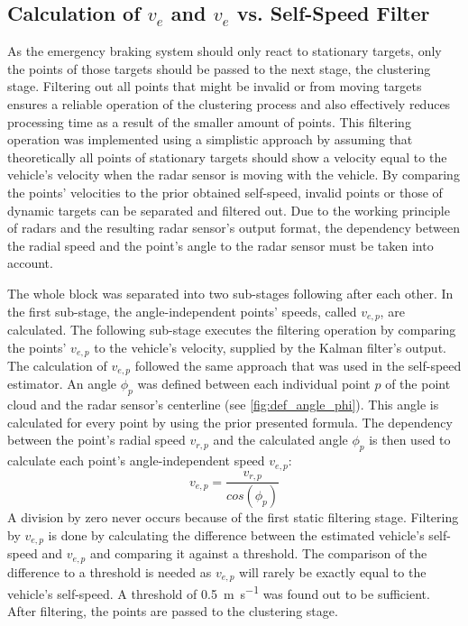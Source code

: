 \subsection{Calculation of $v_{e}$ and $v_{e}$ vs. Self-Speed Filter}

As the emergency braking system should only react to stationary targets, only the points of those targets should be passed to the next stage, the clustering stage.
Filtering out all points that might be invalid or from moving targets ensures a reliable operation of the clustering process and also effectively reduces processing time as a result of the smaller amount of points.
This filtering operation was implemented using a simplistic approach by assuming that theoretically all points of stationary targets should show a velocity equal to the vehicle's velocity when the radar sensor is moving with the vehicle.
By comparing the points' velocities to the prior obtained self-speed, invalid points or those of dynamic targets can be separated and filtered out.
Due to the working principle of radars and the resulting radar sensor's output format, the dependency between the radial speed and the point's angle to the radar sensor must be taken into account.
\par
The whole block was separated into two sub-stages following after each other.
In the first sub-stage, the angle-independent points' speeds, called $v_{e,p}$, are calculated. 
The following sub-stage executes the filtering operation by comparing the points' $v_{e,p}$ to the vehicle's velocity, supplied by the Kalman filter's output.
The calculation of $v_{e,p}$ followed the same approach that was used in the self-speed estimator.
An angle $\phi_{p}$ was defined between each individual point $p$ of the point cloud and the radar sensor's centerline (see \ref{fig:def_angle_phi}).
This angle is calculated for every point by using the prior presented formula.
The dependency between the point's radial speed $v_{r,p}$ and the calculated angle $\phi_{p}$ is then used to calculate each point's angle-independent speed $v_{e,p}$:
\begin{equation*}
    v_{e,p} = \frac{v_{r,p}}{cos(\phi_{p})}
\end{equation*}
A division by zero never occurs because of the first static filtering stage.
Filtering by $v_{e,p}$ is done by calculating the difference between the estimated vehicle's self-speed and $v_{e,p}$ and comparing it against a threshold.
The comparison of the difference to a threshold is needed as $v_{e,p}$ will rarely be exactly equal to the vehicle's self-speed.
A threshold of \SI{0.5}{\meter\per\second} was found out to be sufficient.
After filtering, the points are passed to the clustering stage.

